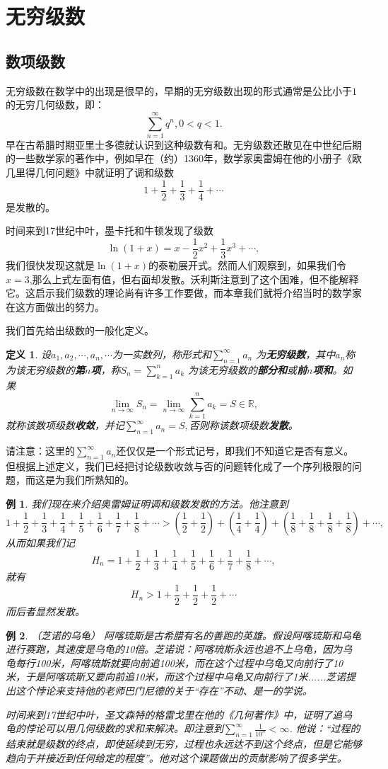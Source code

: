 \documentclass{article}
\newtheorem{definition}{定义}[subsection]
\newtheorem{example}{例}[subsection]
\begin{document}
\section{无穷级数}
\subsection{数项级数}
无穷级数在数学中的出现是很早的，早期的无穷级数出现的形式通常是公比小于$1$的无穷几何级数，即：
$$\sum_{n=1}^\infty q^n,0<q<1.$$
早在古希腊时期亚里士多德就认识到这种级数有和。无穷级数还散见在中世纪后期的一些数学家的著作中，例如早在（约）1360年，数学家奥雷姆在他的小册子《欧几里得几何问题》中就证明了调和级数
$$1+\frac{1}{2}+\frac{1}{3}+\frac{1}{4}+\cdots$$
是发散的。\par
时间来到17世纪中叶，墨卡托和牛顿发现了级数
$$\ln(1+x)=x-\frac{1}{2}x^2+\frac{1}{3}x^3+\cdots,$$
我们很快发现这就是$\ln(1+x)$的泰勒展开式。然而人们观察到，如果我们令$x=3$,那么上式左面有值，但右面却发散。沃利斯注意到了这个困难，但不能解释它。这启示我们级数的理论尚有许多工作要做，而本章我们就将介绍当时的数学家在这方面做出的努力。\par
我们首先给出级数的一般化定义。
\begin{definition}
设$a_1,a_2,\cdots,a_n,\cdots$为一实数列，称形式和$\sum_{n=1}^\infty a_n$
为\textbf{无穷级数}，其中$a_n$称为该无穷级数的\textbf{第$n$项}，称$S_n=\sum_{k=1}^na_k$
为该无穷级数的\textbf{部分和}或\textbf{前$n$项和}。如果
$$\lim_{n\to\infty}S_n=\lim_{n\to\infty}\sum_{k=1}^na_k=S\in\mathbb{R},$$
就称该数项级数\textbf{收敛}，并记$\sum_{n=1}^\infty a_n=S,$否则称该数项级数\textbf{发散}。
\end{definition}
请注意：这里的$\sum_{n=1}^\infty a_n$还仅仅是一个形式记号，即我们不知道它是否有意义。但根据上述定义，我们已经把讨论级数收敛与否的问题转化成了一个序列极限的问题，而这是为我们所熟知的。
\begin{example}
我们现在来介绍奥雷姆证明调和级数发散的方法。他注意到
$$
1+\frac{1}{2}+\frac{1}{3}+\frac{1}{4}+\frac{1}{5}+\frac{1}{6}+\frac{1}{7}+\frac{1}{8}+\cdots >\left( \frac{1}{2}+\frac{1}{2} \right) +\left( \frac{1}{4}+\frac{1}{4} \right) +\left( \frac{1}{8}+\frac{1}{8}+\frac{1}{8}+\frac{1}{8} \right) +\cdots ,
$$
从而如果我们记
$$
H_n=1+\frac{1}{2}+\frac{1}{3}+\frac{1}{4}+\frac{1}{5}+\frac{1}{6}+\frac{1}{7}+\frac{1}{8}+\cdots ,
$$
就有
$$
H_n>1+\frac{1}{2}+\frac{1}{2}+\frac{1}{2}+\cdots 
$$
而后者显然发散。
\end{example}
\begin{example}（芝诺的乌龟）
阿喀琉斯是古希腊有名的善跑的英雄。假设阿喀琉斯和乌龟进行赛跑，其速度是乌龟的10倍。芝诺说：阿喀琉斯永远也追不上乌龟，因为乌龟每行100米，阿喀琉斯就要向前追100米，而在这个过程中乌龟又向前行了10米，于是阿喀琉斯又要向前追10米，而这个过程中乌龟又向前行了1米......芝诺提出这个悖论来支持他的老师巴门尼德的关于“存在”不动、是一的学说。\par
时间来到17世纪中叶，圣文森特的格雷戈里在他的《几何著作》中，证明了追乌龟的悖论可以用几何级数的求和来解决。即注意到$\sum_{n=1}^{\infty}{\frac{1}{10^n}}<\infty $. 他说：“过程的结束就是级数的终点，即使延续到无穷，过程也永远达不到这个终点，但是它能够趋向于并接近到任何给定的程度”。他对这个课题做出的贡献影响了很多学生。
\end{example}
\end{document}
